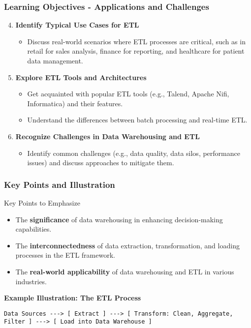 \documentclass{beamer}
\begin{document}
\begin{frame}[fragile]
    \frametitle{Learning Objectives - Applications and Challenges}
    \begin{enumerate}
        \setcounter{enumi}{3}  %
        
        \item \textbf{Identify Typical Use Cases for ETL}  
        \begin{itemize}
            \item Discuss real-world scenarios where ETL processes are critical, such as in retail for sales analysis, finance for reporting, and healthcare for patient data management.
        \end{itemize}

        \item \textbf{Explore ETL Tools and Architectures}  
        \begin{itemize}
            \item Get acquainted with popular ETL tools (e.g., Talend, Apache Nifi, Informatica) and their features.  
            \item Understand the differences between batch processing and real-time ETL.
        \end{itemize}

        \item \textbf{Recognize Challenges in Data Warehousing and ETL}  
        \begin{itemize}
            \item Identify common challenges (e.g., data quality, data silos, performance issues) and discuss approaches to mitigate them.
        \end{itemize}
    \end{enumerate}
\end{frame}

\begin{frame}[fragile]
    \frametitle{Key Points and Illustration}
    \begin{block}{Key Points to Emphasize}
        \begin{itemize}
            \item The \textbf{significance} of data warehousing in enhancing decision-making capabilities.
            \item The \textbf{interconnectedness} of data extraction, transformation, and loading processes in the ETL framework.
            \item The \textbf{real-world applicability} of data warehousing and ETL in various industries.
        \end{itemize}
    \end{block}
    
    \textbf{Example Illustration: The ETL Process} 
    \begin{lstlisting}
Data Sources ---> [ Extract ] ---> [ Transform: Clean, Aggregate, Filter ] ---> [ Load into Data Warehouse ]
    \end{lstlisting}
\end{frame}
\end{document}
